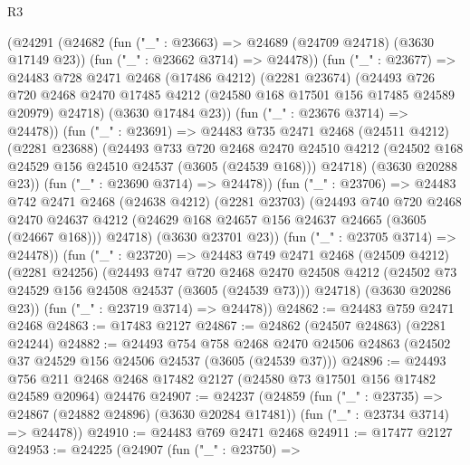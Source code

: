 \begin{lexlean}{R3}
\begin{coremodule}
          (@24291
            (@24682
              (fun ("_" : @23663) => @24689 (@24709 @24718) (@3630 @17149 @23))
              (fun ("_" : @23662 @3714) => @24478))
            (fun ("_" : @23677) =>
            @24483
              @728
              @2471
              @2468
              (@17486 @4212)
              (@2281 @23674)
              (@24493
                @726
                @720
                @2468
                @2470
                @17485
                @4212
                (@24580 @168 @17501 @156 @17485 @24589 @20979)
                @24718)
              (@3630 @17484 @23))
            (fun ("_" : @23676 @3714) => @24478))
          (fun ("_" : @23691) =>
          @24483
            @735
            @2471
            @2468
            (@24511 @4212)
            (@2281 @23688)
            (@24493
              @733
              @720
              @2468
              @2470
              @24510
              @4212
              (@24502 @168 @24529 @156 @24510 @24537 (@3605 (@24539 @168)))
              @24718)
            (@3630 @20288 @23))
          (fun ("_" : @23690 @3714) => @24478))
        (fun ("_" : @23706) =>
        @24483
          @742
          @2471
          @2468
          (@24638 @4212)
          (@2281 @23703)
          (@24493
            @740
            @720
            @2468
            @2470
            @24637
            @4212
            (@24629 @168 @24657 @156 @24637 @24665 (@3605 (@24667 @168)))
            @24718)
          (@3630 @23701 @23))
        (fun ("_" : @23705 @3714) => @24478))
      (fun ("_" : @23720) =>
      @24483
        @749
        @2471
        @2468
        (@24509 @4212)
        (@2281 @24256)
        (@24493
          @747
          @720
          @2468
          @2470
          @24508
          @4212
          (@24502 @73 @24529 @156 @24508 @24537 (@3605 (@24539 @73)))
          @24718)
        (@3630 @20286 @23))
      (fun ("_" : @23719 @3714) => @24478))
@24862 := @24483 @759 @2471 @2468
@24863 := @17483 @2127
@24867 := @24862 (@24507 @24863) (@2281 @24244)
@24882 := @24493
    @754
    @758
    @2468
    @2470
    @24506
    @24863
    (@24502 @37 @24529 @156 @24506 @24537 (@3605 (@24539 @37)))
@24896 := @24493
    @756
    @211
    @2468
    @2468
    @17482
    @2127
    (@24580 @73 @17501 @156 @17482 @24589 @20964)
    @24476
@24907 := @24237
    (@24859
      (fun ("_" : @23735) => @24867 (@24882 @24896) (@3630 @20284 @17481))
      (fun ("_" : @23734 @3714) => @24478))
@24910 := @24483 @769 @2471 @2468
@24911 := @17477 @2127
@24953 := @24225
    (@24907
      (fun ("_" : @23750) =>

\end{coremodule}
\end{lexlean}
